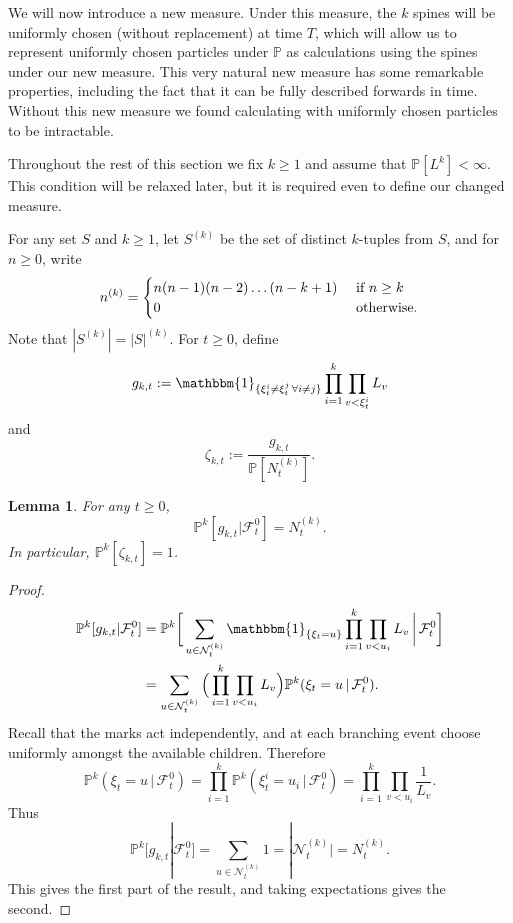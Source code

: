 \documentclass{article}
\theoremstyle{plain}
\newtheorem{lem}[thm]{Lemma}
\theoremstyle{definition}
\renewcommand{\P}{\mathbb{P}}
\newcommand{\F}{\mathcal{F}}
\newcommand{\ind}{\mathbbm{1}}
\newcommand{\Nc}{\mathcal{N}}
\begin{document}
We will now introduce a new measure. Under this measure, the $k$ spines will be uniformly chosen (without replacement) at time $T$, which will allow us to represent uniformly chosen particles under $\P$ as calculations using the spines under our new measure. This very natural new measure has some remarkable properties, including the fact that it can be fully described forwards in time. Without this new measure we found calculating with uniformly chosen particles to be intractable.

Throughout the rest of this section we fix $k\ge 1$ and assume that $\P[L^k]<\infty$. This condition will be relaxed later, but it is required even to define our changed measure.

For any set $S$ and $k\ge 1$, let $S^{(k)}$ be the set of distinct $k$-tuples from $S$, and for $n\ge0$, write
\[n^{(k)} = \begin{cases} n(n-1)(n-2)\ldots (n-k+1) & \hbox{ if } n\ge k\\ 0 &\hbox{ otherwise.}\end{cases}\]
Note that $|S^{(k)}| = |S|^{(k)}$.
For $t\ge 0$, define
\[g_{k,t} := \ind_{\{\xi^i_t \neq \xi^j_t \,\forall i\neq j\}} \prod_{i=1}^k \prod_{v<\xi^i_t} L_v\]
and
\[\zeta_{k,t} := \frac{g_{k,t}}{\P[N^{(k)}_t]}.\]

\begin{lem}\label{gproj}
For any $t\ge 0$,
\[\P^k[g_{k,t}|\F^0_t] = N^{(k)}_t.\]
In particular, $\P^k[\zeta_{k,t}] = 1$.
\end{lem}

\begin{proof}
\begin{align*}
\P^k[g_{k,t}|\F^0_t] &= \P^k\bigg[ \sum_{u\in\Nc_t^{(k)}} \ind_{\{\xi_t = u\}} \prod_{i=1}^k \prod_{v<u_i} L_v \,\bigg|\, \F^0_t\bigg]\\
&= \sum_{u\in\Nc_t^{(k)}} \Big(\prod_{i=1}^k \prod_{v<u_i} L_v\Big) \P^k(\xi_t = u \, |\, \F^0_t).
\end{align*}
Recall that the marks act independently, and at each branching event choose uniformly amongst the available children. Therefore
\begin{equation}\label{Pspineprob}
\P^k(\xi_t = u \, |\, \F^0_t) = \prod_{i=1}^k \P^k(\xi^i_t = u_i\,|\,\F^0_t) = \prod_{i=1}^k \prod_{v<u_i} \frac{1}{L_v}.
\end{equation}
Thus
\[\P^k[g_{k,t}|\F^0_t] = \sum_{u\in\Nc_t^{(k)}} 1 = |\Nc_t^{(k)}| = N_t^{(k)}.\]
This gives the first part of the result, and taking expectations gives the second.
\end{proof}
\end{document}
